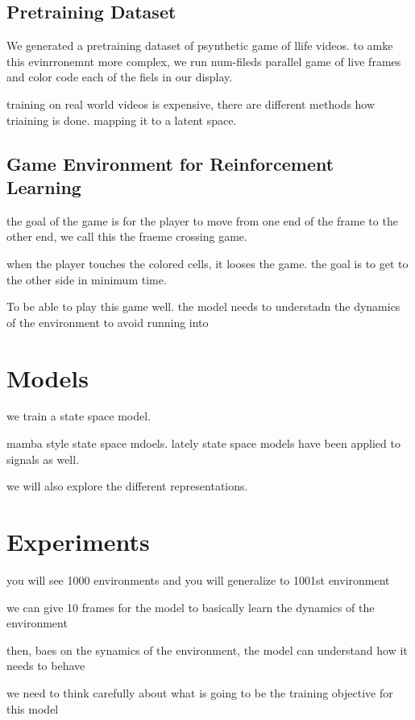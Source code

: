 \newpage
\subsection{Pretraining Dataset}

We generated a pretraining dataset of psynthetic game of llife videos. to amke this evinrronemnt more complex, we run num-fileds parallel game of live frames and color code each of the fiels in our display. 

training on real world videos is expensive, there are different methods how triaining is done. mapping it to a latent space. 

\subsection{Game Environment for Reinforcement Learning}

the goal of the game is for the player to move from one end of the frame to the other end, we call this the fraeme crossing game. 

when the player touches the colored cells, it looses the game. the goal is to get to the other side in minimum time. 

To be able to play this game well. the model needs to understadn the dynamics of the environment to avoid running into 




\section{Models}
we train a state space model.

mamba style state space mdoels. lately state space models have been applied to signals as well. 

we will also explore the different representations. 


\section{Experiments}

you will see 1000 environments and you will generalize to 1001st environment


we can give 10 frames for the model to basically learn the dynamics of the environment

then, baes on the synamics of the environment, the model can understand how it needs to behave 


we need to think carefully about what is going to be the training objective for this model


